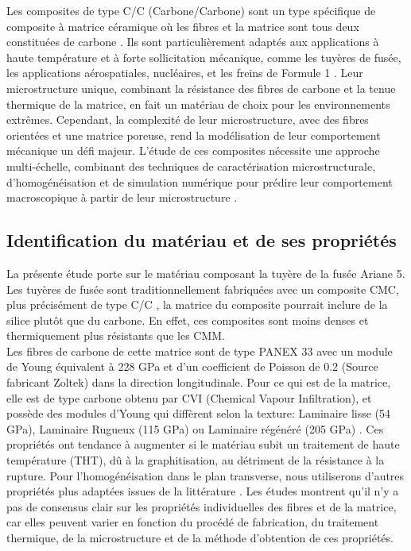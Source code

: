 \documentclass[a4paper,11pt]{article}
\begin{document}
\vspace{0.2cm}
Les composites de type C/C (Carbone/Carbone) sont un type spécifique de composite à matrice céramique où les fibres et la matrice sont tous deux constituées de carbone \cite{SavageCCC}. Ils sont particulièrement adaptés aux applications à haute température et à forte sollicitation mécanique, comme les tuyères de fusée, les applications aérospatiales, nucléaires, et les freins de Formule 1 \cite{CCOverview1} \cite{CharronCC}. Leur microstructure unique, combinant la résistance des fibres de carbone et la tenue thermique de la matrice, en fait un matériau de choix pour les environnements extrêmes. Cependant, la complexité de leur microstructure, avec des fibres orientées et une matrice poreuse, rend la modélisation de leur comportement mécanique un défi majeur. L'étude de ces composites nécessite une approche multi-échelle, combinant des techniques de caractérisation microstructurale, d'homogénéisation et de simulation numérique pour prédire leur comportement macroscopique à partir de leur microstructure \cite{CharronCC}.

\subsection{Identification du matériau et de ses propriétés}

La présente étude porte sur le matériau composant la tuyère de la fusée Ariane 5.
Les tuyères de fusée sont traditionnellement fabriquées avec un composite CMC, plus précisément de type C/C \cite{Ariane94}, la matrice du composite pourrait inclure de la silice plutôt que du carbone. En effet, ces composites sont moins denses et thermiquement plus résistants que les CMM. \\

Les fibres de carbone de cette matrice sont de type PANEX 33 avec un module de Young équivalent à 228 GPa et d'un coefficient de Poisson de 0.2 \cite{CharronCC} (Source fabricant Zoltek) dans la direction longitudinale. Pour ce qui est de la matrice, elle est de type carbone obtenu par CVI (Chemical Vapour Infiltration), et possède des modules d'Young qui diffèrent selon la texture: Laminaire lisse (54 GPa), Laminaire Rugueux (115 GPa) ou Laminaire régénéré (205 GPa) \cite{CharronCC}. Ces propriétés ont tendance à augmenter si le matériau subit un traitement de haute température (THT), dû à la graphitisation, au détriment de la résistance à la rupture. Pour l'homogénéisation dans le plan transverse, nous utiliserons d'autres propriétés plus adaptées issues de la littérature \cite{OzcanCC} \cite{MaurinTransverseCC} \cite{GuruprasadNanoindent}. Les études montrent qu'il n'y a pas de consensus clair sur les propriétés individuelles des fibres et de la matrice, car elles peuvent varier en fonction du procédé de fabrication, du traitement thermique, de la microstructure et de la méthode d'obtention de ces propriétés.
\end{document}
